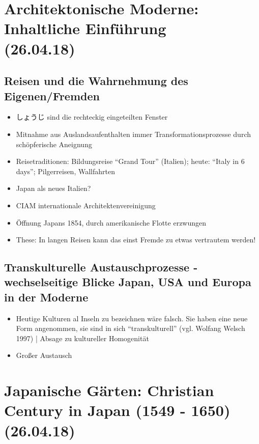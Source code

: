 \documentclass[emulatestandardclasses]{scrartcl}
\begin{document}
\section{Architektonische Moderne: Inhaltliche Einführung\\(26.04.18)}

\subsection{Reisen und die Wahrnehmung des Eigenen/Fremden}

\begin{itemize}
  \item しょうじ sind die rechteckig eingeteilten Fenster
  \item Mitnahme aus Auslandsaufenthalten immer Transformationsprozesse durch schöpferische Aneignung
  \item Reisetraditionen: Bildungsreise "`Grand Tour"' (Italien); heute: "`Italy in 6 days"'; Pilgerreisen, Wallfahrten
  \item Japan als neues Italien?
  \item CIAM internationale Architektenvereinigung
  \item Öffnung Japans 1854, durch amerikanische Flotte erzwungen
  \item These: In langen Reisen kann das einst Fremde zu etwas vertrautem werden!
\end{itemize}

\subsection{Transkulturelle Austauschprozesse - wechselseitige Blicke Japan, USA und Europa in der Moderne}

\begin{itemize}
  \item Heutige Kulturen al Inseln zu bezeichnen wäre falsch. Sie haben eine neue Form angenommen, sie sind in sich "`transkulturell"' (vgl. Wolfang Welsch 1997) | Absage zu kultureller Homogenität
  \item Großer Austausch
\end{itemize}


\section{Japanische Gärten: Christian Century in Japan (1549 - 1650)\\(26.04.18)}
\end{document}
